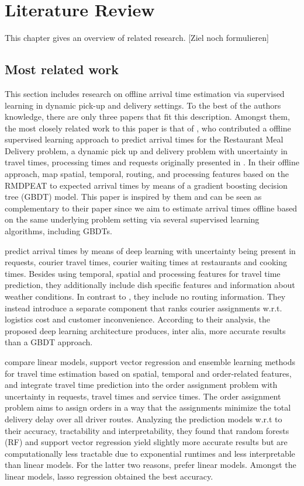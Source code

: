 \chapter{Literature Review}

This chapter gives an overview of related research. [Ziel noch formulieren]


\section{Most related work}
This section includes research on offline arrival time estimation via supervised learning in dynamic pick-up and delivery settings.
To the best of the authors knowledge, there are only three papers that fit this description. Amongst them, the most closely related work to this paper is that of \cite{Hildebrandt2020_EAT}, who contributed a offline supervised learning approach to predict arrival times for the Restaurant Meal Delivery problem, a dynamic pick up and delivery problem with uncertainty in travel times, processing times and requests originally presented in \cite{UlmerRMDP}.
In their offline approach, \cite{Hildebrandt2020_EAT} map spatial, temporal, routing, and processing features based on the RMDPEAT to expected arrival times by means of a gradient boosting decision tree (GBDT) model. This paper is inspired by them and can be seen as complementary to their paper since we aim to estimate arrival times offline based on the same underlying problem setting via several supervised learning algorithms, including GBDTs.

\cite{Zhu2020_OFCTE_DL} predict arrival times by means of deep learning with uncertainty being present in requests, courier travel times, courier waiting times at restaurants and cooking times. Besides using temporal, spatial and processing features for travel time prediction, they additionally include dish specific features and information about weather conditions. In contrast to \cite{Hildebrandt2020_EAT}, they include no routing information. They instead introduce a separate component that ranks courier assignments w.r.t. logistics cost and customer inconvenience. According to their analysis, the proposed deep learning architecture produces, inter alia, more accurate results than a GBDT approach.

\cite{Liu2018_LM_PLM} compare linear models, support vector regression and ensemble learning methods for travel time estimation based on spatial, temporal and order-related features, and integrate travel time prediction into the order assignment problem with uncertainty in requests, travel times and service times. The order assignment problem aims to assign orders in a way that the assignments minimize the total delivery delay over all driver routes. Analyzing the prediction models w.r.t to their accuracy, tractability and interpretability, they found that random forests (RF) and support vector regression yield slightly more accurate results but are computationally less tractable due to exponential runtimes and less interpretable than linear models. For the latter two reasons, \cite{Liu2018_LM_PLM} prefer linear models. Amongst the linear models, lasso regression obtained the best accuracy.


